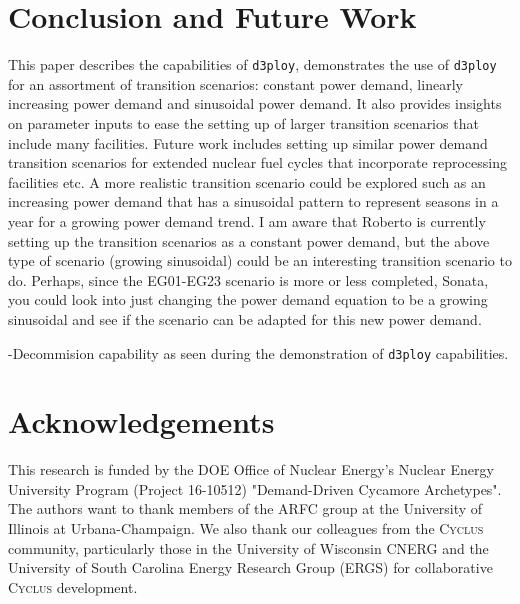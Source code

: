 \documentclass[11pt,letterpaper]{article}
\newcommand{\Cyclus}{\textsc{Cyclus}\xspace}%
\newcommand{\deploy}{\texttt{d3ploy}\xspace}%
\begin{document}
\section{Conclusion and Future Work}
This paper describes the capabilities of \deploy, demonstrates 
the use of \deploy for an assortment of transition scenarios: 
constant power demand, linearly increasing power demand and
sinusoidal power demand.  
It also provides insights on parameter inputs to ease the
setting up of larger transition scenarios that include many facilities. 
Future work includes setting up similar power demand transition 
scenarios for extended nuclear fuel cycles that incorporate reprocessing 
facilities etc. 
A more realistic transition scenario could be explored such as an 
increasing power demand that has a sinusoidal pattern to represent 
seasons in a year for a growing power demand trend. 
I am aware that Roberto is currently setting up the transition 
scenarios as a constant power demand, but the above type of scenario 
(growing sinusoidal) could be an interesting transition scenario 
to do. 
Perhaps, since the EG01-EG23 scenario is more or less completed, 
Sonata, you could look into just changing the power demand equation
to be a growing sinusoidal and see if the scenario can be adapted for 
this new power demand. 

-Decommision capability as seen during the demonstration of \deploy capabilities.

\section{Acknowledgements}
This research is funded by the \gls{DOE} Office of 
Nuclear Energy's Nuclear Energy University Program (Project 16-10512) 
"Demand-Driven Cycamore Archetypes". The authors want to thank 
members of the \gls{ARFC} group at the University of Illinois at 
Urbana-Champaign. 
We also thank our colleagues from the \Cyclus community, 
particularly those in the University of Wisconsin 
\gls{CNERG} and the University of South Carolina Energy Research 
Group (ERGS) for collaborative \Cyclus development.

\pagebreak 


\end{document}

